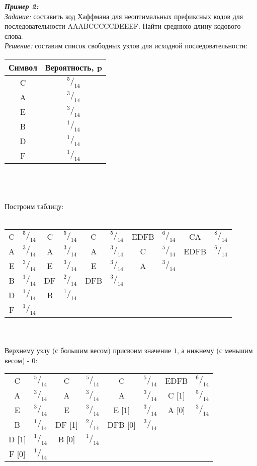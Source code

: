 \emph{\textbf{Пример 2:}}
\\\emph{Задание:} составить код Хаффмана для неоптимальных префиксных кодов для последовательности AAABCCCCCDEEEF. Найти среднюю длину кодового слова.
\\\emph{Решение:} составим список свободных узлов для исходной последовательности:
\\
\begin{minipage}[h]{\textwidth}
\begin{tabular}{|c|c|}
\hline
Символ &  Вероятность, p \\
\hline
C & $^5/_{14}$ \\
A & $^3/_{14}$ \\
E & $^3/_{14}$ \\
B & $^1/_{14}$ \\
D & $^1/_{14}$ \\
F & $^1/_{14}$ \\
\hline
\end{tabular}
\end{minipage}
\\ \\
\\Построим таблицу:
\\
\\\begin{minipage}[h]{\textwidth}
\begin{tabular}{|c|c||c|c||c|c||c|c||c|c|}
\hline
C & $^5/_{14}$ & C & $^5/_{14}$ & C & $^5/_{14}$ & EDFB & $^6/_{14}$ & CA & $^8/_{14}$ \\
A & $^3/_{14}$ & A & $^3/_{14}$ & A & $^3/_{14}$ & C & $^5/_{14}$ & EDFB & $^6/_{14}$ \\
E & $^3/_{14}$ & E & $^3/_{14}$ & E & $^3/_{14}$ & A & $^3/_{14}$ & & \\
B & $^1/_{14}$ & DF & $^2/_{14}$ & DFB & $^3/_{14}$ & & & &\\
D & $^1/_{14}$ & B & $^1/_{14}$ & & & & & &\\
F & $^1/_{14}$ & & & & & & & &\\
\hline
\end{tabular}
\end{minipage}
\\
\\Верхнему узлу (с большим весом) присвоим значение $1$, а нижнему (с меньшим весом) - $0$:
\begin{table}[h]
\begin{tabular}{|c|c||c|c||c|c||c|c|}
\hline
C & $^5/_{14}$ & C & $^5/_{14}$ & C & $^5/_{14}$ & EDFB & $^6/_{14}$   \\
A & $^3/_{14}$ & A & $^3/_{14}$ & A & $^3/_{14}$ & C [1] & $^5/_{14}$   \\
E & $^3/_{14}$ & E & $^3/_{14}$ & E [1] & $^3/_{14}$ & A [0] & $^3/_{14}$  \\
B & $^1/_{14}$ & DF [1] & $^2/_{14}$ & DFB [0] & $^3/_{14}$ & & \\
D [1] & $^1/_{14}$ & B [0] & $^1/_{14}$ & & & & \\
F [0] & $^1/_{14}$ & & & & & & \\
\hline
\end{tabular}
\end{table}
